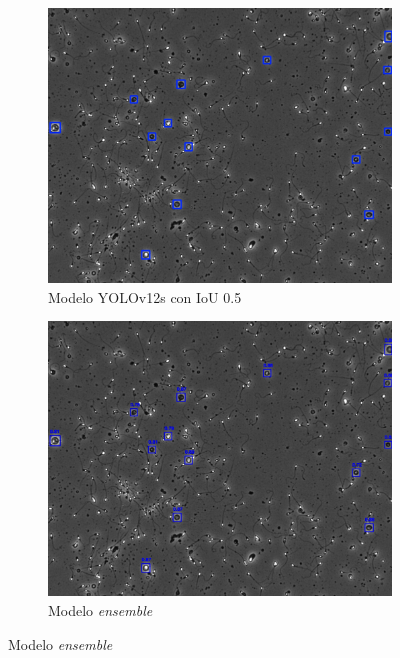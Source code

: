 \documentclass[12pt,a4paper,onecolumn,oneside]{report}
\begin{document}
\begin{figure}[H]
  \vspace{0.3cm} 
  
  \begin{subfigure}[b]{0.48\textwidth}
    \centering
    \includegraphics[width=\textwidth]{figuras/evaluacion_cualitativa/7/7_v12.jpg}
    \caption{Modelo YOLOv12s con IoU 0.5}
    \label{fig:yolov12s_IoU0.5_image_7}
  \end{subfigure}
  \hfill
  \begin{subfigure}[b]{0.48\textwidth}
    \centering
    \includegraphics[width=\textwidth]{figuras/evaluacion_cualitativa/7/7_ensemble.jpg}
    \caption{Modelo \textit{ensemble}}
    \label{fig:ensemble_image_7}
  \end{subfigure}


\end{figure}
\end{document}

